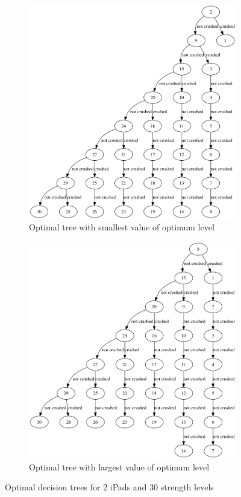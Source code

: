 \documentclass[12pt,a4paper,oneside]{report}
\begin{document}
\begin{figure}[H]
	\centering
	\begin{subfigure}{0.68\textwidth}
		\includegraphics[width=\textwidth]{DecisionTree1}
		\caption{Optimal tree with smallest value of optimum level}
		\label{fig:badtree}
	\end{subfigure}
	\begin{subfigure}{0.68\textwidth}
		\includegraphics[width=\textwidth]{DecisionTree2}
		\caption{Optimal tree with largest value of optimum level}
		\label{fig:goodtree}
	\end{subfigure}
	\caption{Optimal decision trees for 2 iPads and 30 strength levels}
	\label{fig:decisiontrees}
\end{figure}
\end{document}

